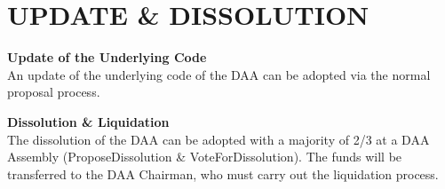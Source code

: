 \section{UPDATE \& DISSOLUTION}\label{sec:update-&-dissolution}

\item \textbf{Update of the Underlying Code} \\
An update of the underlying code of the DAA can be adopted via the normal proposal process.

\item \textbf{Dissolution \& Liquidation} \\
The dissolution of the DAA can be adopted with a majority of 2/3 at a DAA Assembly (ProposeDissolution \& VoteForDissolution). %
The funds will be transferred to the DAA Chairman, who must carry out the liquidation process.
